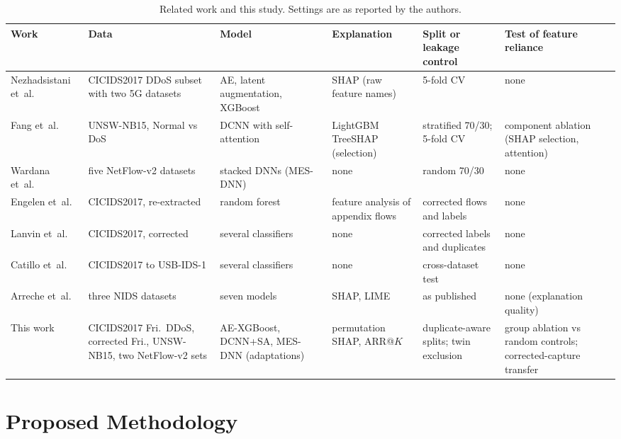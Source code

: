 \documentclass[journal]{IEEEtran}
\begin{document}
\begin{table}[!t]
\centering
\caption{\upshape Related work and this study. Settings are as reported by the authors.}
\label{tab:related}
\footnotesize\renewcommand{\arraystretch}{1.18}
\begin{tabular}{@{}L{2.3cm}L{3.0cm}L{2.5cm}L{2.2cm}L{2.7cm}L{3.0cm}@{}}
\toprule
Work & Data & Model & Explanation & Split or leakage control & Test of feature reliance \\
\midrule
Nezhadsistani et~al.~\cite{nezhadsistani2026} & CICIDS2017 DDoS subset with two 5G datasets & AE, latent augmentation, XGBoost & SHAP (raw feature names) & 5-fold CV & none \\
Fang et~al.~\cite{fang2026} & UNSW-NB15, Normal vs DoS & DCNN with self-attention & LightGBM TreeSHAP (selection) & stratified 70/30; 5-fold CV & component ablation (SHAP selection, attention) \\
Wardana et~al.~\cite{wardana2026} & five NetFlow-v2 datasets & stacked DNNs (MES-DNN) & none & random 70/30 & none \\
Engelen et~al.~\cite{engelen2021} & CICIDS2017, re-extracted & random forest & feature analysis of appendix flows & corrected flows and labels & none \\
Lanvin et~al.~\cite{lanvin2023} & CICIDS2017, corrected & several classifiers & none & corrected labels and duplicates & none \\
Catillo et~al.~\cite{catillo2023} & CICIDS2017 to USB-IDS-1 & several classifiers & none & cross-dataset test & none \\
Arreche et~al.~\cite{arreche2024} & three NIDS datasets & seven models & SHAP, LIME & as published & none (explanation quality) \\
This work & CICIDS2017 Fri.\ DDoS, corrected Fri., UNSW-NB15, two NetFlow-v2 sets & AE-XGBoost, DCNN+SA, MES-DNN (adaptations) & permutation SHAP, ARR@$K$ & duplicate-aware splits; twin exclusion & group ablation vs random controls; corrected-capture transfer \\
\bottomrule
\end{tabular}
\end{table}

\section{Proposed Methodology}
\label{sec:method}
\end{document}
